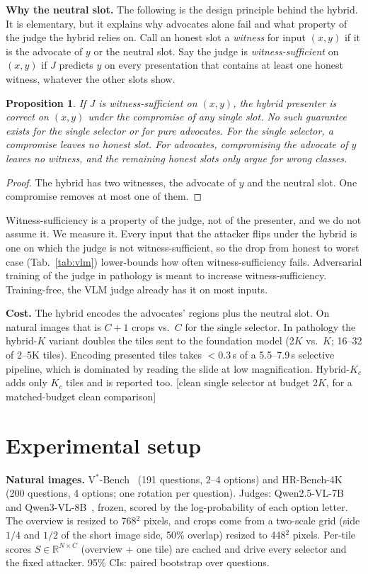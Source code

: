\documentclass[10pt,twocolumn,letterpaper]{article}
\newcommand{\pend}[1]{{\color{red}[#1]}}
\newtheorem{proposition}{Proposition}
\begin{document}
\textbf{Why the neutral slot.} The following is the design principle behind the hybrid. It is elementary, but it explains why advocates alone fail and what property of the judge the hybrid relies on.
Call an honest slot a \emph{witness} for input $(x,y)$ if it is the advocate of $y$ or the neutral slot. Say the judge is \emph{witness-sufficient} on $(x,y)$ if $J$ predicts $y$ on every presentation that contains at least one honest witness, whatever the other slots show.
\begin{proposition}\label{prop:cover}
If $J$ is witness-sufficient on $(x,y)$, the hybrid presenter is correct on $(x,y)$ under the compromise of any single slot. No such guarantee exists for the single selector or for pure advocates. For the single selector, a compromise leaves no honest slot. For advocates, compromising the advocate of $y$ leaves no witness, and the remaining honest slots only argue for wrong classes.
\end{proposition}
\begin{proof}
The hybrid has two witnesses, the advocate of $y$ and the neutral slot. One compromise removes at most one of them.
\end{proof}
Witness-sufficiency is a property of the judge, not of the presenter, and we do not assume it. We measure it. Every input that the attacker flips under the hybrid is one on which the judge is not witness-sufficient, so the drop from honest to worst case (Tab.~\ref{tab:vlm}) lower-bounds how often witness-sufficiency fails. Adversarial training of the judge in pathology is meant to increase witness-sufficiency. Training-free, the VLM judge already has it on most inputs.

\textbf{Cost.} The hybrid encodes the advocates' regions plus the neutral slot. On natural images that is $C{+}1$ crops vs.\ $C$ for the single selector. In pathology the hybrid-$K$ variant doubles the tiles sent to the foundation model (2$K$ vs.\ $K$; 16--32 of 2--5K tiles). Encoding presented tiles takes $<$0.3\,s of a 5.5--7.9\,s selective pipeline, which is dominated by reading the slide at low magnification. Hybrid-$K_c$ adds only $K_c$ tiles and is reported too. \pend{clean single selector at budget 2$K$, for a matched-budget clean comparison}

\section{Experimental setup}\label{sec:setup}
\textbf{Natural images.} V$^*$-Bench~\cite{wu2024vstar} (191 questions, 2--4 options) and HR-Bench-4K~\cite{hrbench} (200 questions, 4 options; one rotation per question). Judges: Qwen2.5-VL-7B~\cite{qwen25vl} and Qwen3-VL-8B~\cite{qwen3vl}, frozen, scored by the log-probability of each option letter. The overview is resized to 768$^2$ pixels, and crops come from a two-scale grid (side $1/4$ and $1/2$ of the short image side, 50\% overlap) resized to 448$^2$ pixels. Per-tile scores $S\in\mathbb{R}^{N\times C}$ (overview + one tile) are cached and drive every selector and the fixed attacker. 95\% CIs: paired bootstrap over questions.
\end{document}
